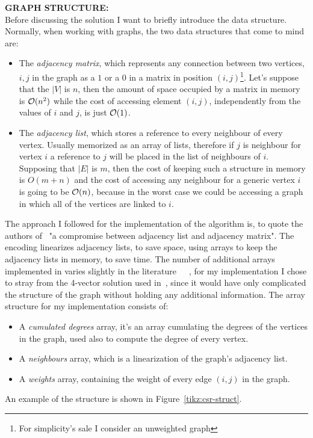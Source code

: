 \documentclass[a4paper,10pt]{article}
\begin{document}
\bigskip
{}
\makeatletter{}\makeatother\label{sec:graph-structure}
\noindent
\textbf{GRAPH STRUCTURE:}
\\
Before discussing the solution I want to briefly introduce the data structure. Normally, when working with graphs, the two data structures that come to mind are:
\begin{itemize}
	\item The \emph{adjacency matrix}, which represents any connection between two vertices, $i,
		j$ in the graph as a $1$ or a $0$ in a matrix in position $(i, j)$\footnote{For simplicity's sale I consider an unweighted graph}. Let's suppose that the $|V|$ is $n$, then the amount of space occupied by a matrix in memory is $\mathcal{O}(n^2)$ while the cost of accessing element $(i, j)$, independently from the values of $i$ and $j$, is just $\mathcal{O}(1)$.
	\item The \emph{adjacency list}, which stores a reference to every neighbour of every vertex. Usually memorized as an array of lists, therefore if $j$ is neighbour for vertex $i$ a reference to $j$ will be placed in the list of neighbours of $i$. Supposing that $|E|$ is $m$, then the cost of keeping such a structure in memory is $O(m + n)$ and the cost of accessing any neighbour for a generic vertex $i$ is going to be $\mathcal{O}(n)$, because in the worst case we could be accessing a graph in which all of the vertices are linked to $i$.
\end{itemize}
The approach I followed for the implementation of the algorithm is, to quote the authors
of~\cite{generic-he-boruvka} "a compromise between adjacency list and adjacency matrix". The \csr
encoding linearizes adjacency lists, to save space, using arrays to keep the adjacency lists in
memory, to save time. The number of additional arrays implemented in \csr varies slightly in the literature~\cite{csr-kelly}~\cite{csr-wheatman}~\cite{generic-he-boruvka}, for my implementation I chose to stray from the 4-vector solution used in~\cite{generic-he-boruvka}, since it would have only complicated the structure of the graph without holding any additional information.
The array structure for my implementation consists of:
\begin{itemize}
	\item A \emph{cumulated degrees} array, it's an array cumulating the degrees of the vertices in the graph, used also to compute the degree of every vertex.
	\item A \emph{neighbours} array, which is a linearization of the graph's adjacency list.
	\item A \emph{weights} array, containing the weight of every edge $(i, j)$ in the graph.
\end{itemize}
An example of the \csr structure is shown in Figure~\ref{tikz:csr-struct}.
\end{document}
